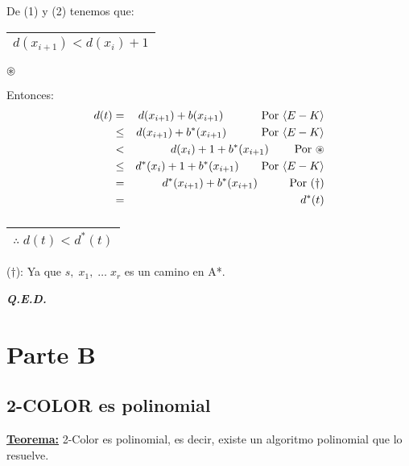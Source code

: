 \documentclass[12pt,a4paper]{report}
\newcommand{\QED}{\hfill \textit{\textbf{Q.E.D.}}}
\begin{document}
\begin{enumerate}
\begin{enumerate}[a)]
								\vspace{5mm}
								\par De (1) y (2) tenemos que: \begin{tabular}{|c|} \hline $d(x_{i+1}) < d(x_{i}) +1 $ \\ \hline \end{tabular} $\circledast$

								\vspace{3mm}
								\par Entonces:
								\begin{eqnarray}
									\nonumber d(t) &=& d(x_{i + 1}) + b(x_{i + 1}) \qquad\;\;\;\;\; \textup{Por } \langle E-K\rangle \\
									\nonumber &\leq & d(x_{i + 1}) + b^{*}(x_{i + 1}) \qquad\;\;\;\; \textup{Por } \langle E-K\rangle \\
									\nonumber &<& d(x_{i}) + 1 + b^{*}(x_{i + 1}) \qquad\; \textup{Por } \circledast \\
									\nonumber &\leq & d^{*}(x_{i}) + 1 + b^{*}(x_{i + 1}) \qquad \textup{Por } \langle E-K\rangle \\
									\nonumber &=& d^{*}(x_{i + 1}) + b^{*}(x_{i + 1}) \qquad\;\;\; \textup{Por } (\dag) \\
									\nonumber &=& d^{*}(t)
								\end{eqnarray}
								$\qquad\qquad\qquad\;\;\;$
								\begin{tabular}{|c|} \hline $\therefore \; d(t) < d^{*}(t)$ \\ \hline \end{tabular}

								\vspace{5mm}
								\par ($\dag$): Ya que $s, \; x_{1}, \; \dotsc \; x_{r}$ es un camino en A*.
						\end{enumerate}
			\end{enumerate}

		\QED


\chapter{Parte B}

	\section{2-COLOR es polinomial}
		\textbf{\underline{Teorema:}} 2-Color es polinomial, es decir, existe un algoritmo polinomial que lo resuelve.
\end{document}
